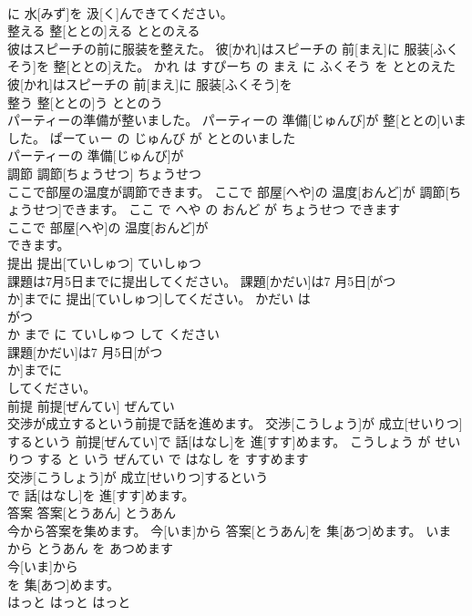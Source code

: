 \documentclass[8pt]{extreport}
\begin{document}
\begin{CJK}{UTF8}{min}
\\	に 水[みず]を 汲[く]んできてください。			
\\	整える	整[ととの]える	ととのえる	
\\	彼はスピーチの前に服装を整えた。	彼[かれ]はスピーチの 前[まえ]に 服装[ふくそう]を 整[ととの]えた。	かれ は すぴーち の まえ に ふくそう を ととのえた	
\\	彼[かれ]はスピーチの 前[まえ]に 服装[ふくそう]を
\\	整う	整[ととの]う	ととのう	
\\	パーティーの準備が整いました。	パーティーの 準備[じゅんび]が 整[ととの]いました。	ぱーてぃー の じゅんび が ととのいました	
\\	パーティーの 準備[じゅんび]が
\\	調節	調節[ちょうせつ]	ちょうせつ	
\\	ここで部屋の温度が調節できます。	ここで 部屋[へや]の 温度[おんど]が 調節[ちょうせつ]できます。	ここ で へや の おんど が ちょうせつ できます	
\\	ここで 部屋[へや]の 温度[おんど]が
\\	できます。			
\\	提出	提出[ていしゅつ]	ていしゅつ	
\\	課題は7月5日までに提出してください。	課題[かだい]は7 月5日[がつ 
\\	か]までに 提出[ていしゅつ]してください。	かだい は 
\\	がつ 
\\	か まで に ていしゅつ して ください	
\\	課題[かだい]は7 月5日[がつ 
\\	か]までに
\\	してください。			
\\	前提	前提[ぜんてい]	ぜんてい	
\\	交渉が成立するという前提で話を進めます。	交渉[こうしょう]が 成立[せいりつ]するという 前提[ぜんてい]で 話[はなし]を 進[すす]めます。	こうしょう が せいりつ する と いう ぜんてい で はなし を すすめます	
\\	交渉[こうしょう]が 成立[せいりつ]するという
\\	で 話[はなし]を 進[すす]めます。			
\\	答案	答案[とうあん]	とうあん	
\\	今から答案を集めます。	今[いま]から 答案[とうあん]を 集[あつ]めます。	いま から とうあん を あつめます	
\\	今[いま]から
\\	を 集[あつ]めます。			
\\	はっと	はっと	はっと	

\end{CJK}
\end{document}
